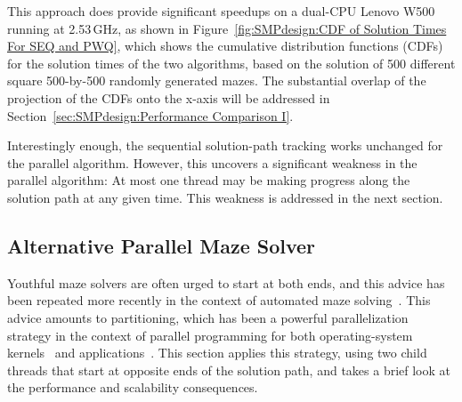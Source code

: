 This approach does provide significant speedups on a dual-CPU
Lenovo W500 running at 2.53\,GHz, as shown in
Figure~\ref{fig:SMPdesign:CDF of Solution Times For SEQ and PWQ},
which shows the cumulative distribution functions (CDFs) for the solution
times of the two algorithms, based on the solution of 500 different square
500-by-500 randomly generated mazes.
The substantial overlap
of the projection of the CDFs onto the x-axis will be addressed in
Section~\ref{sec:SMPdesign:Performance Comparison I}.

Interestingly enough, the sequential solution-path tracking works unchanged
for the parallel algorithm.
However, this uncovers a significant weakness in the parallel algorithm:
At most one thread may be making progress along the solution path at
any given time.
This weakness is addressed in the next section.

\subsection{Alternative Parallel Maze Solver}
\label{sec:SMPdesign:Alternative Parallel Maze Solver}

Youthful maze solvers are often urged to start at both ends, and
this advice has been repeated more recently in the context of automated
maze solving~\cite{UMD:CMSC433maze}.
This advice amounts to partitioning, which has been a powerful
parallelization strategy
in the context of parallel programming for both operating-system
kernels~\cite{Beck85,Inman85} and
applications~\cite{DavidAPatterson2010TroubleMulticore}.
This section applies this strategy, using two child threads that start
at opposite ends of the solution path, and takes a brief look at the
performance and scalability consequences.

\begin{listing}[tbp]
\begin{fcvlabel}
\end{fcvlabel}
\caption{Partitioned Parallel Solver Pseudocode}
\label{lst:SMPdesign:Partitioned Parallel Solver Pseudocode}
\end{listing}

